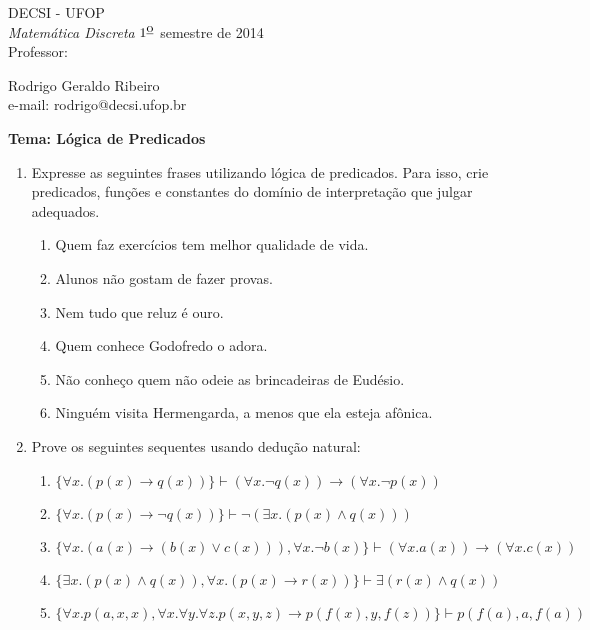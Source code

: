 \documentclass[11pt,a4paper]{report}
\begin{document}
 
 \hfill DECSI - UFOP \\
{\it Matem\'atica Discreta}
 \hfill $\mbox{1}^{\mbox{\underline{o}}}$ semestre de 2014 \\
Professor: \parbox[t]{14cm}{Rodrigo Geraldo Ribeiro \\
                     e-mail: rodrigo@decsi.ufop.br}
 
 \hfill {\bf Tema: L\'ogica de Predicados}
 
\vspace*{3mm}
\begin{enumerate}
  	\item Expresse as seguintes frases utilizando l\'ogica de predicados. 
	      Para isso, crie predicados, fun\c{c}\~oes e constantes do dom\'inio
	      de interpreta\c{c}\~ao que julgar adequados.
	\begin{enumerate}
		\item Quem faz exerc\'icios tem melhor qualidade de vida.
		\item Alunos n\~ao gostam de fazer provas.
		\item Nem tudo que reluz \'e ouro.
		\item Quem conhece Godofredo o adora.
		\item N\~ao conhe\c{c}o quem n\~ao odeie as brincadeiras de Eud\'esio.
		\item Ningu\'em visita Hermengarda, a menos que ela esteja af\^onica.
	\end{enumerate}
	\item Prove os seguintes sequentes usando dedu\c{c}\~ao natural:
	\begin{enumerate}
		\item $\{\forall x. (p(x)\rightarrow q(x))\}\vdash(\forall x.\neg q(x))\rightarrow(\forall x.\neg p(x))$
		\item $\{\forall x. (p(x)\rightarrow \neg q(x))\}\vdash\neg (\exists x. (p(x)\land q(x)))$
		\item $\{\forall x.(a(x)\rightarrow (b(x)\lor c(x))),\forall x.\neg b(x)\}\vdash(\forall x. a(x))\rightarrow 
		       (\forall x. c(x))$
		\item $\{\exists x. (p(x)\land q(x)), \forall x. (p(x)\rightarrow r(x))\}\vdash\exists (r(x)\land q(x))$
		\item $\{\forall x. p(a,x,x), \forall x.\forall y.\forall z. p(x,y,z)\rightarrow p(f(x),y,f(z))\}\vdash p(f(a),a,f(a))$
	\end{enumerate}
   \end{enumerate}
\end{document}

